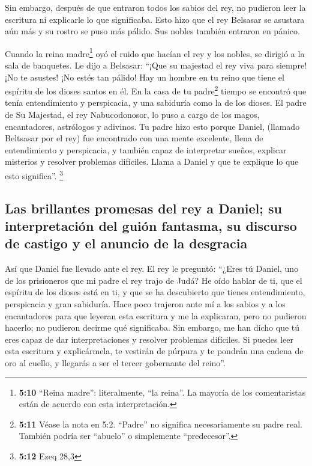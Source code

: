  Sin embargo, después de que entraron todos los sabios del
rey, no pudieron leer la escritura ni explicarle lo que significaba.
 Esto hizo que el rey Belsasar se asustara aún más y su
rostro se puso más pálido. Sus nobles también entraron en pánico.

 Cuando la reina madre\footnote{\textbf{5:10} ``Reina
  madre'': literalmente, ``la reina''. La mayoría de los comentaristas
  están de acuerdo con esta interpretación.} oyó el ruido que hacían el
rey y los nobles, se dirigió a la sala de banquetes. Le dijo a Belsasar:
``¡Que su majestad el rey viva para siempre! ¡No te asustes! ¡No estés
tan pálido!  Hay un hombre en tu reino que tiene el
espíritu de los dioses santos en él. En la casa de tu padre\footnote{\textbf{5:11}
  Véase la nota en 5:2. ``Padre'' no significa necesariamente su padre
  real. También podría ser ``abuelo'' o simplemente ``predecesor''.}
tiempo se encontró que tenía entendimiento y perspicacia, y una
sabiduría como la de los dioses. El padre de Su Majestad, el rey
Nabucodonosor, lo puso a cargo de los magos, encantadores, astrólogos y
adivinos. Tu padre hizo esto  porque Daniel, (llamado
Beltsasar por el rey) fue encontrado con una mente excelente, llena de
entendimiento y perspicacia, y también capaz de interpretar sueños,
explicar misterios y resolver problemas difíciles. Llama a Daniel y que
te explique lo que esto significa''. \footnote{\textbf{5:12} Ezeq 28,3}

\hypertarget{las-brillantes-promesas-del-rey-a-daniel-su-interpretaciuxf3n-del-guiuxf3n-fantasma-su-discurso-de-castigo-y-el-anuncio-de-la-desgracia}{%
\subsection{Las brillantes promesas del rey a Daniel; su interpretación
del guión fantasma, su discurso de castigo y el anuncio de la
desgracia}\label{las-brillantes-promesas-del-rey-a-daniel-su-interpretaciuxf3n-del-guiuxf3n-fantasma-su-discurso-de-castigo-y-el-anuncio-de-la-desgracia}}

 Así que Daniel fue llevado ante el rey. El rey le
preguntó: ``¿Eres tú Daniel, uno de los prisioneros que mi padre el rey
trajo de Judá?  He oído hablar de ti, que el espíritu de
los dioses está en ti, y que se ha descubierto que tienes entendimiento,
perspicacia y gran sabiduría.  Hace poco trajeron ante mí
a los sabios y a los encantadores para que leyeran esta escritura y me
la explicaran, pero no pudieron hacerlo; no pudieron decirme qué
significaba.  Sin embargo, me han dicho que tú eres capaz
de dar interpretaciones y resolver problemas difíciles. Si puedes leer
esta escritura y explicármela, te vestirán de púrpura y te pondrán una
cadena de oro al cuello, y llegarás a ser el tercer gobernante del
reino''.

